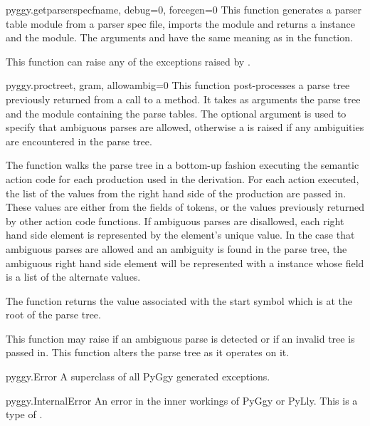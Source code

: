 \begin{funcdesc}{pyggy.getparser}{specfname, debug=0, forcegen=0}
This function generates a parser table module from a parser spec file,
imports the module and returns a  instance
and the module.  The arguments  and  have the
same meaning as in the  function.

This function can raise any of the exceptions raised by .
\end{funcdesc}


\begin{funcdesc}{pyggy.proctree}{t, gram, allowambig=0}
This function post-processes a parse tree previously returned
from a call to a  method.  It takes as arguments
the parse tree and the module containing the parse tables.  The
optional argument  is used to specify that ambiguous
parses are allowed, otherwise a  is
raised if any ambiguities are encountered in the parse tree.

The function walks the parse tree in a bottom-up fashion executing
the semantic action code for each production used in the derivation.
For each action executed, the list of the values from the right
hand side of the production are passed in.  These values are either
from the  fields of tokens, or the values previously
returned by other action code functions.  If ambiguous parses are
disallowed, each right hand side element is represented by the
element's unique value.  In the case that ambiguous parses are allowed
and an ambiguity is found in the parse tree, the ambiguous right
hand side element will be represented with a 
instance whose  field is a list of the alternate
values. 

The  function returns the value associated with
the start symbol which is at the root of the parse tree.

This function may raise  if an ambiguous
parse is detected or  if an invalid tree is passed in.
This function alters the parse tree as it operates on it.
\end{funcdesc}

\begin{excdesc}{pyggy.Error}
A superclass of all PyGgy generated exceptions.
\end{excdesc}

\begin{excdesc}{pyggy.InternalError}
An error in the inner workings of PyGgy or PyLly.  This is a type
of .
\end{excdesc}

